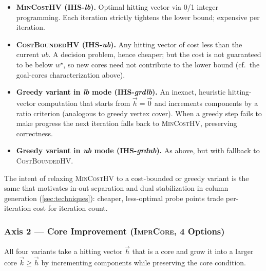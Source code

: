 \begin{itemize}
\item \textbf{\textsc{MinCostHV} (IHS-\emph{lb}).} Optimal hitting vector via
0/1 integer programming. Each iteration strictly tightens the lower bound;
expensive per iteration.

\item \textbf{\textsc{CostBoundedHV} (IHS-\emph{ub}).} Any hitting vector of
cost less than the current $\mathit{ub}$. A decision problem, hence cheaper;
but the cost is not guaranteed to be below $w^\star$, so new cores need not
contribute to the lower bound (cf.\ the goal-cores characterization above).

\item \textbf{Greedy variant in \emph{lb} mode (IHS-\emph{grdlb}).} An
inexact, heuristic hitting-vector computation that starts from
$\vec{h} = \vec{0}$ and increments components by a ratio criterion (analogous
to greedy vertex cover). When a greedy step fails to make progress the next
iteration falls back to \textsc{MinCostHV}, preserving correctness.

\item \textbf{Greedy variant in \emph{ub} mode (IHS-\emph{grdub}).} As above,
but with fallback to \textsc{CostBoundedHV}.
\end{itemize}

The intent of relaxing \textsc{MinCostHV} to a cost-bounded or greedy variant
is the same that motivates in-out separation and dual stabilization in
column generation (\cref{sec:techniques}): cheaper, less-optimal
probe points trade per-iteration cost for iteration count.

\subsubsection{Axis 2 --- Core Improvement (\textsc{ImprCore}, 4 Options)}

All four variants take a hitting vector $\vec{h}$ that is a core and grow it
into a larger core $\vec{k} \ge \vec{h}$ by incrementing components while
preserving the core condition.

